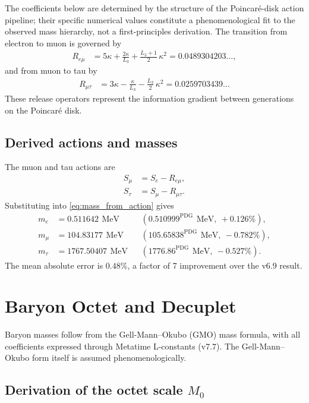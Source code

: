 \documentclass[aps,prd,reprint,twocolumn,showpacs,superscriptaddress]{revtex4-2}
\newcommand{\mev}{\,\text{MeV}}
\newcommand{\PDG}[1]{\ensuremath{#1^{\text{PDG}}}}
\begin{document}
The coefficients below are determined by the structure of the
Poincar\'{e}-disk action pipeline; their specific numerical values
constitute a phenomenological fit to the observed mass hierarchy,
not a first-principles derivation.  The transition from electron to
muon is governed by
\begin{align}
R_{e\mu} &= 5\kappa + \frac{2\kappa}{L_3} +
\frac{L_3 + 1}{2}\,\kappa^2 = 0.0489304203\ldots,
\label{eq:R_em}
\end{align}
and from muon to tau by
\begin{align}
R_{\mu\tau} &= 3\kappa - \frac{\kappa}{L_3} -
\frac{L_3}{2}\,\kappa^2 = 0.0259703439\ldots
\label{eq:R_mt}
\end{align}
These release operators represent the information gradient between
generations on the Poincar\'{e} disk.

\subsection{Derived actions and masses}

The muon and tau actions are
\begin{align}
S_\mu &= S_e - R_{e\mu}, \\
S_\tau &= S_\mu - R_{\mu\tau}.
\end{align}
Substituting into \eqref{eq:mass_from_action} gives
\begin{align}
m_e &= 0.511642\ \mev &&(\PDG{0.510999}\ \mev,\ +0.126\%), \\
m_\mu &= 104.83177\ \mev &&(\PDG{105.65838}\ \mev,\ -0.782\%), \\
m_\tau &= 1767.50407\ \mev &&(\PDG{1776.86}\ \mev,\ -0.527\%).
\end{align}
The mean absolute error is $0.48\%$, a factor of 7 improvement over the
v6.9 result.

\section{Baryon Octet and Decuplet}
\label{sec:baryons}

Baryon masses follow from the Gell-Mann--Okubo (GMO) mass formula, with
all coefficients expressed through Metatime L-constants (v7.7).
The Gell-Mann--Okubo form itself is assumed phenomenologically.

\subsection{Derivation of the octet scale $M_0$}
\end{document}

